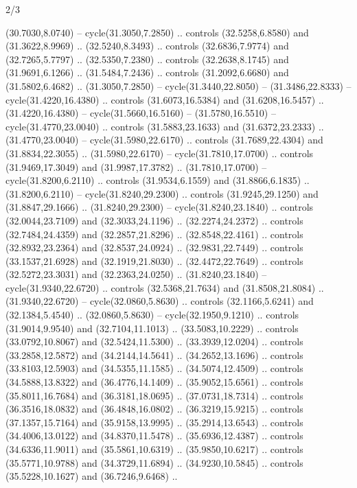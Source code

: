 \begin{flagdescription}{2/3}
\begin{scope}[yshift=\flagwidth,scale=\flagwidth/1241.93737]
\begin{scope}[y=-1mm, x=1mm,draw=gold,fill=blue,line join=miter,miter limit=4,line width=1.8\lw]
\begin{scope}[y=1mm, x=1mm, yscale=-1,shift={(573.68mm+\str,145.75)}]
\begin{scope}[scale=1.35,shift={(-9,-3)}]
\begin{scope}[scale=0.55]
\begin{scope}[scale=1.333]
    (30.7030,8.0740) -- cycle(31.3050,7.2850) .. controls (32.5258,6.8580) and
    (31.3622,8.9969) .. (32.5240,8.3493) .. controls (32.6836,7.9774) and
    (32.7265,5.7797) .. (32.5350,7.2380) .. controls (32.2638,8.1745) and
    (31.9691,6.1266) .. (31.5484,7.2436) .. controls (31.2092,6.6680) and
    (31.5802,6.4682) .. (31.3050,7.2850) -- cycle(31.3440,22.8050) --
    (31.3486,22.8333) -- cycle(31.4220,16.4380) .. controls (31.6073,16.5384) and
    (31.6208,16.5457) .. (31.4220,16.4380) -- cycle(31.5660,16.5160) --
    (31.5780,16.5510) -- cycle(31.4770,23.0040) .. controls (31.5883,23.1633) and
    (31.6372,23.2333) .. (31.4770,23.0040) -- cycle(31.5980,22.6170) .. controls
    (31.7689,22.4304) and (31.8834,22.3055) .. (31.5980,22.6170) --
    cycle(31.7810,17.0700) .. controls (31.9469,17.3049) and (31.9987,17.3782) ..
    (31.7810,17.0700) -- cycle(31.8200,6.2110) .. controls (31.9534,6.1559) and
    (31.8866,6.1835) .. (31.8200,6.2110) -- cycle(31.8240,29.2300) .. controls
    (31.9245,29.1250) and (31.8847,29.1666) .. (31.8240,29.2300) --
    cycle(31.8240,23.1840) .. controls (32.0044,23.7109) and (32.3033,24.1196) ..
    (32.2274,24.2372) .. controls (32.7484,24.4359) and (32.2857,21.8296) ..
    (32.8548,22.4161) .. controls (32.8932,23.2364) and (32.8537,24.0924) ..
    (32.9831,22.7449) .. controls (33.1537,21.6928) and (32.1919,21.8030) ..
    (32.4472,22.7649) .. controls (32.5272,23.3031) and (32.2363,24.0250) ..
    (31.8240,23.1840) -- cycle(31.9340,22.6720) .. controls (32.5368,21.7634) and
    (31.8508,21.8084) .. (31.9340,22.6720) -- cycle(32.0860,5.8630) .. controls
    (32.1166,5.6241) and (32.1384,5.4540) .. (32.0860,5.8630) --
    cycle(32.1950,9.1210) .. controls (31.9014,9.9540) and (32.7104,11.1013) ..
    (33.5083,10.2229) .. controls (33.0792,10.8067) and (32.5424,11.5300) ..
    (33.3939,12.0204) .. controls (33.2858,12.5872) and (34.2144,14.5641) ..
    (34.2652,13.1696) .. controls (33.8103,12.5903) and (34.5355,11.1585) ..
    (34.5074,12.4509) .. controls (34.5888,13.8322) and (36.4776,14.1409) ..
    (35.9052,15.6561) .. controls (35.8011,16.7684) and (36.3181,18.0695) ..
    (37.0731,18.7314) .. controls (36.3516,18.0832) and (36.4848,16.0802) ..
    (36.3219,15.9215) .. controls (37.1357,15.7164) and (35.9158,13.9995) ..
    (35.2914,13.6543) .. controls (34.4006,13.0122) and (34.8370,11.5478) ..
    (35.6936,12.4387) .. controls (34.6336,11.9011) and (35.5861,10.6319) ..
    (35.9850,10.6217) .. controls (35.5771,10.9788) and (34.3729,11.6894) ..
    (34.9230,10.5845) .. controls (35.5228,10.1627) and (36.7246,9.6468) ..

\end{scope}
\end{scope}
\end{scope}
\end{scope}
\end{scope}
\end{scope}
\end{flagdescription}
